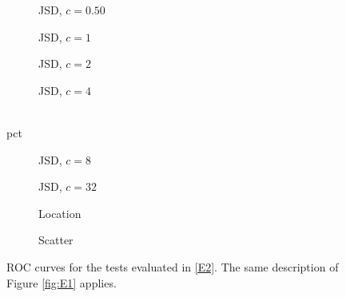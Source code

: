 \documentclass[oneside,11pt]{article}
\begin{document}
\begin{figure}[htpb!]
    \centering
    \begin{subfigure}{0.25\textwidth}
        \centering
        \caption{\small JSD, $c=0.
        50$} \label{fig:E2:a}
    \end{subfigure}%
    \begin{subfigure}{0.25\textwidth}
        \centering
        \caption{\small JSD, $c=1$} \label{fig:E2:b}
    \end{subfigure}%
    \begin{subfigure}{0.25\textwidth}
        \centering
        \caption{\small JSD, $c=2$} \label{fig:E2:b2}
    \end{subfigure}%
    \begin{subfigure}{0.25\textwidth}
        \centering
        \caption{\small JSD, $c=4$} \label{fig:E2:c}
    \end{subfigure}\\pct
    \begin{subfigure}{0.25\textwidth}
        \centering
        \caption{\small JSD, $c=8$} \label{fig:E2:d}
    \end{subfigure}%
    \begin{subfigure}{0.25\textwidth}
        \centering
        \caption{\small JSD, $c=32$} \label{fig:E2:f}
    \end{subfigure}%
    \begin{subfigure}{0.25\textwidth}
        \centering
        \caption{\small Location} \label{fig:E2:g}
    \end{subfigure}%
    \begin{subfigure}{0.25\textwidth}
        \centering
        \caption{\small Scatter} \label{fig:E2:h}
    \end{subfigure}
    \caption{\small ROC curves for the tests evaluated in \ref{E2}. The same description of Figure \ref{fig:E1} applies.}
    \label{fig:E2}
\end{figure}
\end{document}
